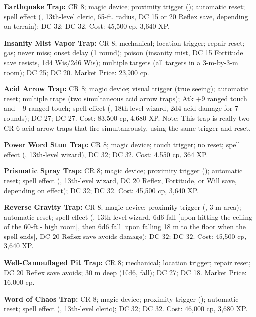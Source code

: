 \textbf{Earthquake Trap:} CR 8; magic device; proximity trigger (); automatic reset; spell effect (, 13th-level cleric, 65-ft. radius, DC 15 or 20 Reflex save, depending on terrain);  DC 32;  DC 32. Cost: 45,500 cp, 3,640 XP.

\textbf{Insanity Mist Vapor Trap:} CR 8; mechanical; location trigger; repair reset; gas; never miss; onset delay (1 round); poison (insanity mist, DC 15 Fortitude save resists, 1d4 Wis/2d6 Wis); multiple targets (all targets in a 3-m-by-3-m room);  DC 25;  DC 20. Market Price: 23,900 cp.

\textbf{Acid Arrow Trap:} CR 8; magic device; visual trigger (true seeing); automatic reset; multiple traps (two simultaneous acid arrow traps); Atk +9 ranged touch and +9 ranged touch; spell effect (, 18th-level wizard, 2d4 acid damage for 7 rounds);  DC 27;  DC 27. Cost: 83,500 cp, 4,680 XP. Note: This trap is really two CR 6 acid arrow traps that fire simultaneously, using the same trigger and reset.

\textbf{Power Word Stun Trap:} CR 8; magic device; touch trigger; no reset; spell effect (, 13th-level wizard),  DC 32;  DC 32. Cost: 4,550 cp, 364 XP.

\textbf{Prismatic Spray Trap:} CR 8; magic device; proximity trigger (); automatic reset; spell effect (, 13th-level wizard, DC 20 Reflex, Fortitude, or Will save, depending on effect);  DC 32;  DC 32. Cost: 45,500 cp, 3,640 XP.

\textbf{Reverse Gravity Trap:} CR 8; magic device; proximity trigger (, 3-m area); automatic reset; spell effect (, 13th-level wizard, 6d6 fall [upon hitting the ceiling of the 60-ft.- high room], then 6d6 fall [upon falling 18 m to the floor when the spell ends], DC 20 Reflex save avoids damage);  DC 32;  DC 32. Cost: 45,500 cp, 3,640 XP.

\textbf{Well-Camouflaged Pit Trap:} CR 8; mechanical; location trigger; repair reset; DC 20 Reflex save avoids; 30 m deep (10d6, fall);  DC 27;  DC 18. Market Price: 16,000 cp.

\textbf{Word of Chaos Trap:} CR 8; magic device; proximity trigger (); automatic reset; spell effect (, 13th-level cleric);  DC 32;  DC 32. Cost: 46,000 cp, 3,680 XP.

